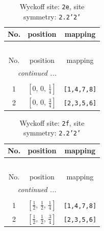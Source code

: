 \documentclass[fleqn,8pt]{jsarticle}
\begin{document}
\begin{longtable}{ccc}
\caption{Wyckoff site: {\tt 2e}, site symmetry: {\tt 2.2'2'}}
 \\
 \hline \hline
No. & position & mapping \\ \hline \endfirsthead

\multicolumn{2}{l}{\tablename\ \thetable{}} \\
 \hline \hline
No. & position & mapping \\ \hline \endhead

 \hline \hline
\multicolumn{2}{r}{\footnotesize\it continued ...} \\ \endfoot

 \hline \hline
\multicolumn{2}{r}{} \\ \endlastfoot

1 & $\left[ 0,\, 0,\, \frac{1}{4} \right]$ & {\tt [1,4,7,8]} \\ \hline
2 & $\left[ 0,\, 0,\, \frac{3}{4} \right]$ & {\tt [2,3,5,6]} \\
\end{longtable}
\renewcommand{\arraystretch}{1.2}
\begin{longtable}{ccc}
\caption{Wyckoff site: {\tt 2f}, site symmetry: {\tt 2.2'2'}}
 \\
 \hline \hline
No. & position & mapping \\ \hline \endfirsthead

\multicolumn{2}{l}{\tablename\ \thetable{}} \\
 \hline \hline
No. & position & mapping \\ \hline \endhead

 \hline \hline
\multicolumn{2}{r}{\footnotesize\it continued ...} \\ \endfoot

 \hline \hline
\multicolumn{2}{r}{} \\ \endlastfoot

1 & $\left[ \frac{1}{2},\, \frac{1}{2},\, \frac{1}{4} \right]$ & {\tt [1,4,7,8]} \\ \hline
2 & $\left[ \frac{1}{2},\, \frac{1}{2},\, \frac{3}{4} \right]$ & {\tt [2,3,5,6]} \\
\end{longtable}
\renewcommand{\arraystretch}{1.2}
\end{document}
